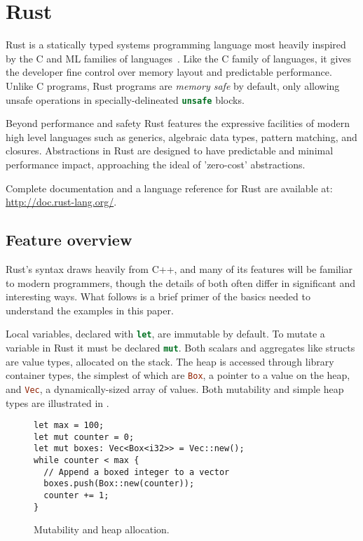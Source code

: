 
\section{Rust}
\label{sec:rust}

Rust is a statically typed systems programming language most heavily inspired by the C
and ML families of languages~\cite{RUST}.
Like the C family of languages, it gives the developer fine control over memory layout
and predictable performance.
Unlike C programs, Rust programs are \emph{memory safe} by default,
only allowing unsafe operations in specially-delineated \lstinline[language=Rust]{unsafe} blocks.

Beyond performance and safety Rust features the expressive facilities
of modern high level languages such as generics, algebraic data types,
pattern matching, and closures.
Abstractions in Rust are designed to have predictable and minimal
performance impact, approaching the ideal of 'zero-cost' abstractions.

Complete documentation and a language reference for Rust are available at: \url{http://doc.rust-lang.org/}.

\subsection{Feature overview}

Rust's syntax draws heavily from C++, and many of its features will be
familiar to modern programmers, though the details of both
often differ in significant and interesting ways.
What follows is a brief primer of the basics needed to understand the examples in this paper.

Local variables, declared with \lstinline[language=Rust]{let}, are immutable by default.
To mutate a variable in Rust it must be declared \lstinline[language=Rust]{mut}.
Both scalars and aggregates like structs are value types, allocated on the stack.
The heap is accessed through library container types, the simplest of which are \lstinline[language=Rust]{Box},
a pointer to a value on the heap, and \lstinline[language=Rust]{Vec}, a dynamically-sized
array of values. Both mutability and simple heap types are
illustrated in .

\begin{figure}
\begin{lstlisting}
let max = 100;
let mut counter = 0;
let mut boxes: Vec<Box<i32>> = Vec::new();
while counter < max {
  // Append a boxed integer to a vector
  boxes.push(Box::new(counter));
  counter += 1;
}
\end{lstlisting}
  \caption{Mutability and heap allocation.}
  \label{fig:mut}
\end{figure}

